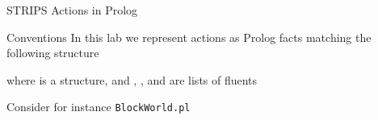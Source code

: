 \documentclass[presentation]{beamer}\mode<presentation>{\usetheme{AMSBolognaFC}}
\begin{document}
\begin{frame}[c]{STRIPS Actions in Prolog}

\begin{block}{Conventions}
    In this lab we represent actions as Prolog facts matching the following structure
    \begin{center}
    \end{center}
    where  is a structure, and , , and  are lists of fluents

\end{block}

\begin{exampleblock}{Consider for instance \texttt{BlockWorld.pl}}
    
\end{exampleblock}

\end{frame}
\end{document}
